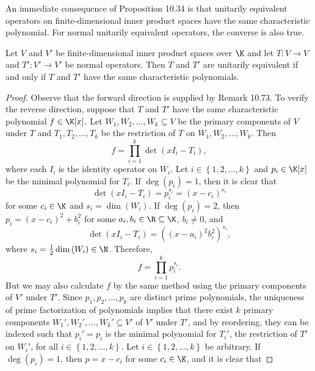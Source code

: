 \documentclass[linearalgebra]{subfiles}
\begin{document}
    \begin{remark}
        An immediate consequence of Proposition 10.34 is that unitarily equivalent operators on finite-dimensional inner product spaces have the same characteristic polynomial. For normal unitarily equivalent operators, the converse is also true.
    \end{remark}

    \begin{theorem}{}
        Let $V$ and $V'$ be finite-dimensional inner product spaces over $\K$ and let $T:V\to V$ and $T':V'\to V'$ be normal operators. Then $T$ and $T'$ are unitarily equivalent if and only if $T$ and $T'$ have the same characteristic polynomials.
    \end{theorem}

    \begin{proof}
        Observe that the forward direction is supplied by Remark 10.73. To verify the reverse direction, suppose that $T$ and $T'$ have the same characteristic polynomial $f\in\K[x]$. Let $W_1,W_2,\ldots,W_k\subseteq V$ be the primary components of $V$ under $T$ and $T_1,T_2,\ldots,T_k$ be the restriction of $T$ on $W_1,W_2,\ldots,W_k$. Then
        \begin{equation*}
            f = \prod^{k}_{i=1} \det\left( xI_i-T_i \right) ,
        \end{equation*}
        where each $I_i$ is the identity operator on $W_i$. Let $i\in\left\lbrace 1,2,\ldots,k \right\rbrace$ and $p_i\in\K[x]$ be the minimal polynomial for $T_i$. If $\deg\left( p_i \right) =1$, then it is clear that
        \begin{equation*}
            \det\left( xI_i-T_i \right) = p_i^{s_i} = \left( x-c_i \right) ^{s_i}
        \end{equation*}
        for some $c_i\in\K$ and $s_i=\dim\left( W_i \right)$. If $\deg\left( p_i \right) = 2$, then $p_i = \left( x-c_i \right) ^{2} + b_i^{2}$ for some $a_i,b_i\in\R\subseteq\K$, $b_i\neq 0$, and
        \begin{equation*}
            \det\left( xI_i-T_i \right) = \left( \left( x-a_i \right) ^2 b_i^2\right) ^{s_i},
        \end{equation*}
        where $s_i=\frac{1}{2}\dim\left( W_i \right) \in\N$. Therefore,
        \begin{equation*}
            f = \prod^{k}_{i=1} p_i^{s_i}.
        \end{equation*}
        But we may also calculate $f$ by the same method using the primary components of $V'$ under $T'$. Since $p_1,p_2,\ldots,p_k$ are distinct prime polynomials, the uniqueness of prime factorization of polynomials implies that there exist $k$ primary components $W_1', W_2', \ldots, W_k'\subseteq V'$ of $V'$ under $T'$, and by reordering, they can be indexed such that $p_i'=p_i$ is the minimal polynomial for $T_i'$, the restriction of $T'$ on $W_i'$, for all $i\in\left\lbrace 1,2,\ldots,k \right\rbrace$. Let $i\in\left\lbrace 1,2,\ldots,k \right\rbrace$ be arbitrary. If $\deg\left( p_i \right) = 1$, then $p=x-c_i$ for some $c_i\in\K$, and it is clear that

\end{proof}
\end{document}
